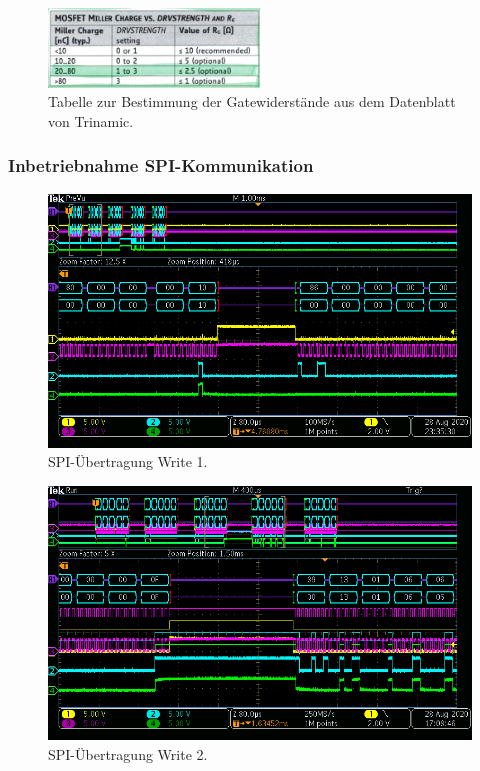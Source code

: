 \begin{figure}[H]
	\centering
	\includegraphics[width=0.5\textwidth]{graphics/Tabelle_Gatewiderstaende.png}
	\caption{Tabelle zur Bestimmung der Gatewiderstände aus dem Datenblatt von Trinamic.}
	\label{fig:Tabelle_Gatewiderstaende}
\end{figure}

\subsubsection{Inbetriebnahme SPI-Kommunikation}\label{Appendix:TMC6200_SPI}

\begin{figure}[H]
\center
\includegraphics[width = \textwidth]{graphics/TMC6200_Beschreiben2}
\caption{SPI-Übertragung Write 1.}
\label{fig:TMC6200_Beschreiben2}
\end{figure}

\begin{figure}[H]
\center
\includegraphics[width = \textwidth]{graphics/TMC6200_Beschreiben}
\caption{SPI-Übertragung Write 2.}
\label{fig:TMC6200_Beschreiben}
\end{figure}


